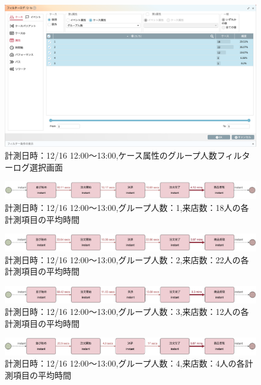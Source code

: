 \documentclass{jsarticle}
\begin{document}
\begin{figure}[H]
  \centering
  \includegraphics[width=15cm]{1216123.png}
  \caption{計測日時：12/16 12:00〜13:00,ケース属性のグループ人数フィルターログ選択画面}
  \label{fig:1216123}
\end{figure}

\begin{figure}[H]
  \centering
  \includegraphics[width=15cm]{1-5b.png}
  \caption{計測日時：12/16 12:00〜13:00,グループ人数：1,来店数：18人の各計測項目の平均時間}
  \label{fig:1-5b}
\end{figure}

\begin{figure}[H]
  \centering
  \includegraphics[width=15cm]{2-5b.png}
  \caption{計測日時：12/16 12:00〜13:00,グループ人数：2,来店数：22人の各計測項目の平均時間}
  \label{fig:2-5b}
\end{figure}

\begin{figure}[H]
  \centering
  \includegraphics[width=15cm]{3-5b.png}
  \caption{計測日時：12/16 12:00〜13:00,グループ人数：3,来店数：12人の各計測項目の平均時間}
  \label{fig:3-5b}
\end{figure}

\begin{figure}[H]
  \centering
  \includegraphics[width=15cm]{4-5b.png}
  \caption{計測日時：12/16 12:00〜13:00,グループ人数：4,来店数：4人の各計測項目の平均時間}
  \label{fig:4-5b}
\end{figure}
\end{document}
